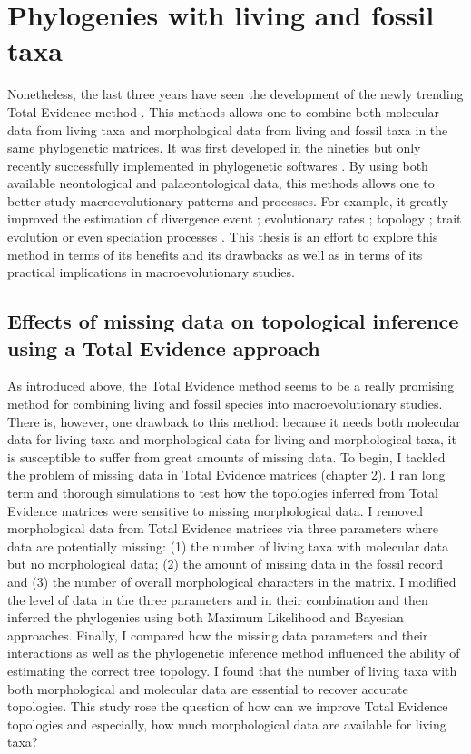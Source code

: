 \section{Phylogenies with living and fossil taxa}
Nonetheless, the last three years have seen the development of the newly trending Total Evidence method \citep{ronquista2012,slaterphylogenetic2013,Wood01032013,schragocombining2013,beckancient2014,Arcila2015131,Dembo2015}.
This methods allows one to combine both molecular data from living taxa and morphological data from living and fossil taxa in the same phylogenetic matrices.
It was first developed in the nineties \citep{eernissetaxonomic1993} but only recently successfully implemented in phylogenetic softwares \citep{Ronquist2012mrbayes,BEAST2}.
By using both available neontological and palaeontological data, this methods allows one to better study macroevolutionary patterns and processes.
For example, it greatly improved the estimation of divergence event \citep[e.g.][]{ronquista2012}; evolutionary rates \citep[e.g.][]{beckancient2014}; topology \citep[e.g.][]{Dembo2015}; trait evolution \citep[e.g.][]{slaterphylogenetic2013} or even speciation processes \citep[e.g.][]{Wood01032013}.
This thesis is an effort to explore this method in terms of its benefits and its drawbacks as well as in terms of its practical implications in macroevolutionary studies.

\subsection{Effects of missing data on topological inference using a Total Evidence approach}
As introduced above, the Total Evidence method seems to be a really promising method for combining living and fossil species into macroevolutionary studies.
There is, however, one drawback to this method: because it needs both molecular data for living taxa and morphological data for living and morphological taxa, it is susceptible to suffer from great amounts of missing data.
To begin, I tackled the problem of missing data in Total Evidence matrices (chapter 2).
I ran long term and thorough simulations to test how the topologies inferred from Total Evidence matrices were sensitive to missing morphological data.
I removed morphological data from Total Evidence matrices via three parameters where data are potentially missing: (1) the number of living taxa with molecular data but no morphological data; (2) the amount of missing data in the fossil record and (3) the number of overall morphological characters in the matrix.
I modified the level of data in the three parameters and in their combination and then inferred the phylogenies using both Maximum Likelihood and Bayesian approaches.
Finally, I compared how the missing data parameters and their interactions as well as the phylogenetic inference method influenced the ability of estimating the correct tree topology.
I found that the number of living taxa with both morphological and molecular data are essential to recover accurate topologies.
This study rose the question of how can we improve Total Evidence topologies and especially, how much morphological data are available for living taxa?

